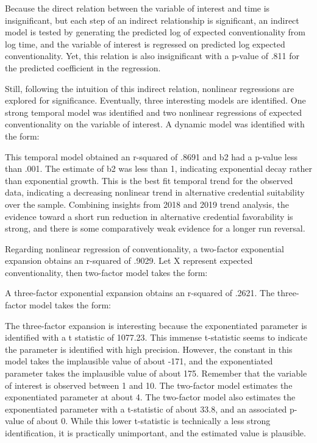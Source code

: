\documentclass[AER]{/Users/zyl357/Documents/GitHub/research-dissertation-case-for-alt-ed/papers/alt-ed-survey/aea-latex-templates/AEA}
\begin{document}
Because the direct relation between the variable of interest and time is
insignificant, but each step of an indirect relationship is significant,
an indirect model is tested by generating the predicted log of expected
conventionality from log time, and the variable of interest is regressed
on predicted log expected conventionality. Yet, this relation is also
insignificant with a p-value of .811 for the predicted coefficient in the
regression.

Still, following the intuition of this indirect relation, nonlinear
regressions are explored for significance. Eventually, three interesting
models are identified. One strong temporal model was identified and two
nonlinear regressions of expected conventionality on the variable of
interest. A dynamic model was identified with the form:

This temporal model obtained an r-squared of .8691 and b2 had a p-value
less than .001. The estimate of b2 was less than 1, indicating exponential
decay rather than exponential growth. This is the best fit temporal trend
for the observed data, indicating a decreasing nonlinear trend in
alternative credential suitability over the sample. Combining insights
from 2018 and 2019 trend analysis, the evidence toward a short run
reduction in alternative credential favorability is strong, and there is
some comparatively weak evidence for a longer run reversal.

Regarding nonlinear regression of conventionality, a two-factor
exponential expansion obtains an r-squared of .9029. Let X represent
expected conventionality, then two-factor model takes the form:

A three-factor exponential expansion obtains an r-squared of .2621. The
three-factor model takes the form:

The three-factor expansion is interesting because the exponentiated
parameter is identified with a t statistic of 1077.23. This immense
t-statistic seems to indicate the parameter is identified with high
precision. However, the constant in this model takes the implausible value
of about -171, and the exponentiated parameter takes the implausible value
of about 175. Remember that the variable of interest is observed between 1
and 10. The two-factor model estimates the exponentiated parameter at
about 4. The two-factor model also estimates the exponentiated parameter
with a t-statistic of about 33.8, and an associated p-value of about 0.
While this lower t-statistic is technically a less strong identification,
it is practically unimportant, and the estimated value is plausible.
\end{document}

